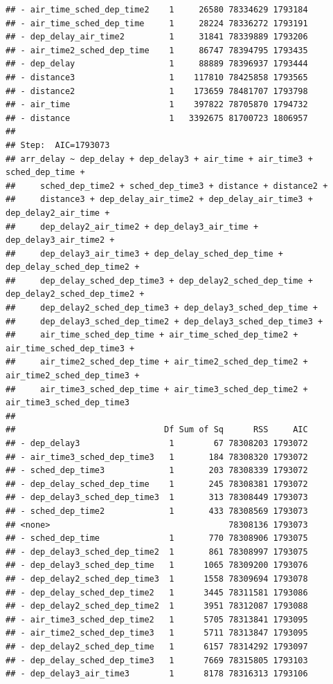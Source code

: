 \documentclass[
]{article}
\begin{document}
\begin{verbatim}
## - air_time_sched_dep_time2    1     26580 78334629 1793184
## - air_time_sched_dep_time     1     28224 78336272 1793191
## - dep_delay_air_time2         1     31841 78339889 1793206
## - air_time2_sched_dep_time    1     86747 78394795 1793435
## - dep_delay                   1     88889 78396937 1793444
## - distance3                   1    117810 78425858 1793565
## - distance2                   1    173659 78481707 1793798
## - air_time                    1    397822 78705870 1794732
## - distance                    1   3392675 81700723 1806957
## 
## Step:  AIC=1793073
## arr_delay ~ dep_delay + dep_delay3 + air_time + air_time3 + sched_dep_time + 
##     sched_dep_time2 + sched_dep_time3 + distance + distance2 + 
##     distance3 + dep_delay_air_time2 + dep_delay_air_time3 + dep_delay2_air_time + 
##     dep_delay2_air_time2 + dep_delay3_air_time + dep_delay3_air_time2 + 
##     dep_delay3_air_time3 + dep_delay_sched_dep_time + dep_delay_sched_dep_time2 + 
##     dep_delay_sched_dep_time3 + dep_delay2_sched_dep_time + dep_delay2_sched_dep_time2 + 
##     dep_delay2_sched_dep_time3 + dep_delay3_sched_dep_time + 
##     dep_delay3_sched_dep_time2 + dep_delay3_sched_dep_time3 + 
##     air_time_sched_dep_time + air_time_sched_dep_time2 + air_time_sched_dep_time3 + 
##     air_time2_sched_dep_time + air_time2_sched_dep_time2 + air_time2_sched_dep_time3 + 
##     air_time3_sched_dep_time + air_time3_sched_dep_time2 + air_time3_sched_dep_time3
## 
##                              Df Sum of Sq      RSS     AIC
## - dep_delay3                  1        67 78308203 1793072
## - air_time3_sched_dep_time3   1       184 78308320 1793072
## - sched_dep_time3             1       203 78308339 1793072
## - dep_delay_sched_dep_time    1       245 78308381 1793072
## - dep_delay3_sched_dep_time3  1       313 78308449 1793073
## - sched_dep_time2             1       433 78308569 1793073
## <none>                                    78308136 1793073
## - sched_dep_time              1       770 78308906 1793075
## - dep_delay3_sched_dep_time2  1       861 78308997 1793075
## - dep_delay3_sched_dep_time   1      1065 78309200 1793076
## - dep_delay2_sched_dep_time3  1      1558 78309694 1793078
## - dep_delay_sched_dep_time2   1      3445 78311581 1793086
## - dep_delay2_sched_dep_time2  1      3951 78312087 1793088
## - air_time3_sched_dep_time2   1      5705 78313841 1793095
## - air_time2_sched_dep_time3   1      5711 78313847 1793095
## - dep_delay2_sched_dep_time   1      6157 78314292 1793097
## - dep_delay_sched_dep_time3   1      7669 78315805 1793103
## - dep_delay3_air_time3        1      8178 78316313 1793106

\end{verbatim}
\end{document}
